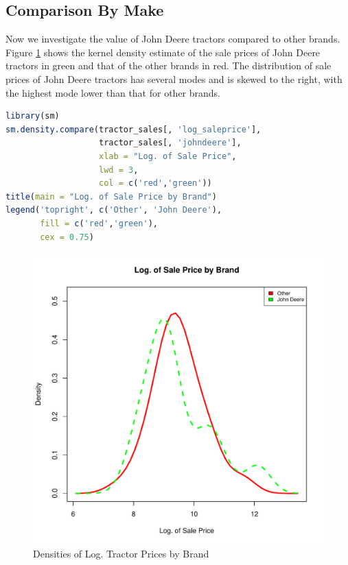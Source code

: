 \pagebreak
\subsection{Comparison By Make}

Now we investigate the value of John Deere tractors
compared to other brands.
Figure \ref{fig:dens_by_brand} shows the
kernel density estimate of the sale prices of John Deere tractors
in green and that of the other brands in red.
%
The distribution of sale prices of John Deere tractors has several modes and is skewed to the right,
with the highest mode lower than that for other brands.


\begin{lstlisting}[language=R]
library(sm)
sm.density.compare(tractor_sales[, 'log_saleprice'],
                   tractor_sales[, 'johndeere'],
                   xlab = "Log. of Sale Price",
                   lwd = 3,
                   col = c('red','green'))
title(main = "Log. of Sale Price by Brand")
legend('topright', c('Other', 'John Deere'),
       fill = c('red','green'),
       cex = 0.75)
\end{lstlisting}


\begin{figure}[h!]
  \centering
  \includegraphics[scale = 0.5, keepaspectratio=true]{../Figures/dens_by_brand}
  \caption{Densities of Log. Tractor Prices by Brand} \label{fig:dens_by_brand}
\end{figure}


